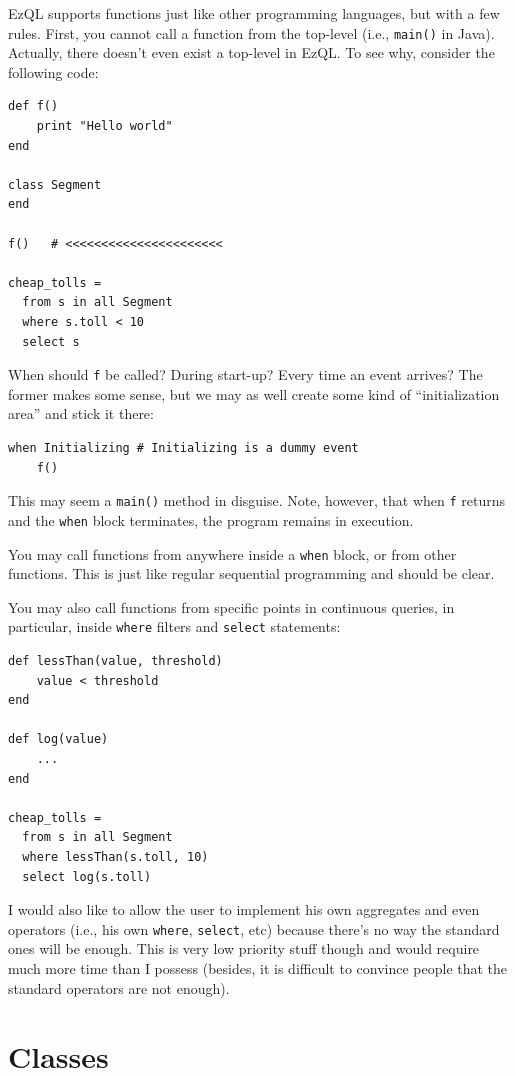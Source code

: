 \documentclass{report}
\begin{document}
EzQL supports functions just like other programming languages, but
with a few rules. First, you cannot call a function from the top-level
(i.e., \verb=main()= in Java). Actually, there doesn't even exist a
top-level in EzQL. To see why, consider the following code:

\begin{verbatim}
def f()
    print "Hello world"
end

class Segment
end

f()   # <<<<<<<<<<<<<<<<<<<<<<

cheap_tolls =
  from s in all Segment
  where s.toll < 10
  select s
\end{verbatim}

When should \verb=f= be called? During start-up? Every time an event
arrives? The former makes some sense, but we may as well create some
kind of ``initialization area'' and stick it there:

\begin{verbatim}
when Initializing # Initializing is a dummy event
    f()
\end{verbatim}

This may seem a \verb=main()= method in disguise. Note, however, that
when \verb=f= returns and the \verb=when= block terminates, the
program remains in execution.

You may call functions from anywhere inside a \verb=when= block, or
from other functions. This is just like regular sequential programming
and should be clear.

You may also call functions from specific points in continuous
queries, in particular, inside \verb=where= filters and \verb=select=
statements:

\begin{verbatim}
def lessThan(value, threshold)
    value < threshold
end

def log(value)
    ...
end

cheap_tolls =
  from s in all Segment
  where lessThan(s.toll, 10)
  select log(s.toll)
\end{verbatim}

I would also like to allow the user to implement his own aggregates
and even operators (i.e., his own \verb=where=, \verb=select=, etc)
because there's no way the standard ones will be enough. This is very
low priority stuff though and would require much more time than I
possess (besides, it is difficult to convince people that the standard
operators are not enough).

\section{Classes}
\end{document}
